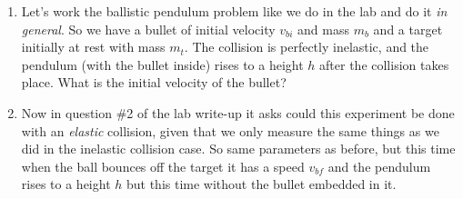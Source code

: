 \begin{enumerate}
\item Let's work the ballistic pendulum problem like we do in the lab and do it \emph{in general}. So we have a bullet of initial velocity $v_{bi}$ and mass $m_b$ and a target initially at rest with mass $m_t$. The collision is perfectly inelastic, and the pendulum (with the bullet inside) rises to a height $h$ after the collision takes place. What is the initial velocity of the bullet?
\giantskip
\item Now in question \#2 of the lab write-up it asks could this experiment be done with an \emph{elastic} collision, given that we only measure the same things as we did in the inelastic collision case. So same parameters as before, but this time when the ball bounces off the target it has a speed $v_{bf}$ and the pendulum rises to a height $h$ but this time without the bullet embedded in it.
\giantskip
\end{enumerate}